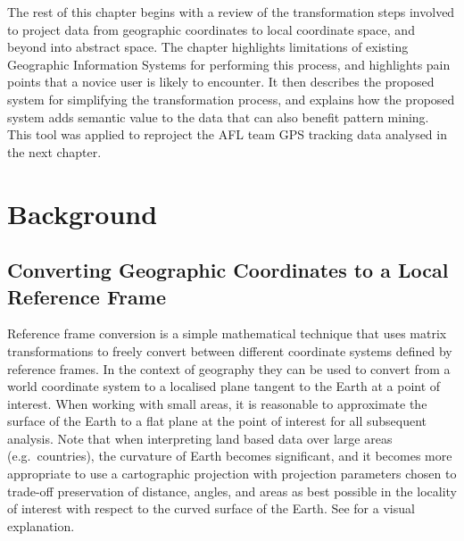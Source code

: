 
The rest of this chapter begins with a review of the transformation steps
involved to project data from geographic coordinates to local coordinate
space, and beyond into abstract space. The chapter highlights limitations of
existing Geographic Information Systems for performing this process, and
highlights pain points that a novice user is likely to encounter. It then
describes the proposed system for simplifying the transformation process, and explains how
the proposed system adds semantic value to the data that can also benefit
pattern mining. This tool was applied to reproject the AFL team GPS tracking data analysed in the next chapter.

\section{Background}\label{background}

\subsection{Converting Geographic Coordinates to a Local Reference
Frame}\label{converting-geographic-coordinates-to-a-local-reference-frame}


Reference frame conversion is a simple mathematical technique that uses
matrix transformations to freely convert between different coordinate
systems defined by reference frames. In the context of geography they
can be used to convert from a world coordinate system to a localised
plane tangent to the Earth at a point of interest. When working with
small areas, it is reasonable to approximate the surface of the Earth to
a flat plane at the point of interest for all subsequent analysis. Note
that when interpreting land based data over large areas
(e.g.~countries), the curvature of Earth becomes significant, and it
becomes more appropriate to use a cartographic projection with
projection parameters chosen to trade-off preservation of distance,
angles, and areas as best possible in the locality of interest with
respect to the curved surface of the Earth. See  for a visual explanation.

